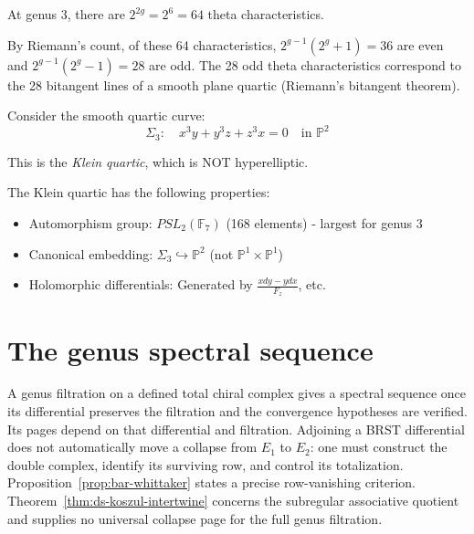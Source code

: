 \begin{theorem}
\label{thm:theta-g3}
At genus 3, there are $2^{2g} = 2^6 = 64$ theta characteristics.

By Riemann's count, of these 64 characteristics, $2^{g-1}(2^g+1) = 36$ are even and $2^{g-1}(2^g-1) = 28$ are odd. The 28 odd theta characteristics correspond to the 28 bitangent lines of a smooth plane quartic (Riemann's bitangent theorem).
\end{theorem}

\begin{example}
\label{ex:klein-quartic-g3}
Consider the smooth quartic curve:
\begin{equation}
\Sigma_3: \quad x^3 y + y^3 z + z^3 x = 0 \quad \text{in } \mathbb{P}^2
\end{equation}

This is the \emph{Klein quartic}, which is NOT hyperelliptic.

The Klein quartic has the following properties:
\begin{itemize}
\item Automorphism group: $PSL_2(\mathbb{F}_7)$ (168 elements) - largest for genus 3
\item Canonical embedding: $\Sigma_3 \hookrightarrow \mathbb{P}^2$ (not $\mathbb{P}^1 \times \mathbb{P}^1$)
\item Holomorphic differentials: Generated by $\frac{x dy - y dx}{F_z}$, etc.
\end{itemize}
\end{example}

\section{The genus spectral sequence}
\label{sec:genus-spectral-complete}

A genus filtration on a defined total chiral complex gives a spectral sequence once its differential preserves the filtration and the convergence hypotheses are verified.
Its pages depend on that differential and filtration.
Adjoining a BRST differential does not automatically move a collapse from $E_1$ to $E_2$: one must construct the double complex, identify its surviving row, and control its totalization.
Proposition~\ref{prop:bar-whittaker} states a precise row-vanishing criterion.
Theorem~\ref{thm:ds-koszul-intertwine} concerns the subregular associative quotient and supplies no universal collapse page for the full genus filtration.

